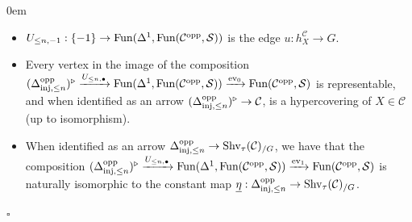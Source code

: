 \documentclass[10pt]{article}
\newcommand{\mS}{\mathcal S}
\newcommand{\C}{\mathcal C}
\renewcommand{\qed}{\hfill$\square$}
\renewenvironment{proof}{\begin{addmargin}[1em]{0em}\begin{newproof}}{\end{newproof}\end{addmargin}\qed}
\theoremstyle{witharg}
\theoremstyle{witharg}
\theoremstyle{witharg2}
\begin{document}
\begin{proof}
\begin{itemize}
       \item [\textnormal{(ii)}] $U_{\leq n,-1}:\{-1\}\rightarrow \textnormal{Fun}(\Delta^1,\textnormal{Fun}(\C^{\textnormal{opp}},\mS))$ is the edge $u:h^\C_X\rightarrow G$. 
       
       \item [\textnormal{(iii)}] Every vertex in the image of the composition $(\Delta^{\textnormal{opp}}_{\textnormal{inj},\leq n})^\triangleright\xrightarrow{U_{\leq n,\bullet}} \textnormal{Fun}(\Delta^1,\textnormal{Fun}(\C^{\textnormal{opp}},\mS))\xrightarrow{\textnormal{ev}_0}\textnormal{Fun}(\C^{\textnormal{opp}},\mS)$ is representable, and when identified as an arrow $(\Delta^{\textnormal{opp}}_{\textnormal{inj},\leq n})^\triangleright\rightarrow \C$, is a hypercovering of $X\in \C$ (up to isomorphism).

       \item [(iv)] When identified as an arrow $\Delta^{\textnormal{opp}}_{\textnormal{inj},\leq n}\rightarrow \textnormal{Shv}_\tau(\C)_{/G}$, we have that the composition $(\Delta^{\textnormal{opp}}_{\textnormal{inj},\leq n})^\triangleright\xrightarrow{U_{\leq n,\bullet}} \textnormal{Fun}(\Delta^1,\textnormal{Fun}(\C^{\textnormal{opp}},\mS))\xrightarrow{\textnormal{ev}_1}\textnormal{Fun}(\C^{\textnormal{opp}},\mS)$ is naturally isomorphic to the constant map $\underline{\eta}:\Delta^{\textnormal{opp}}_{\textnormal{inj},\leq n}\rightarrow\textnormal{Shv}_\tau(\C)_{/G}$. 
     

   \end{itemize}


\end{proof}
\end{document}
